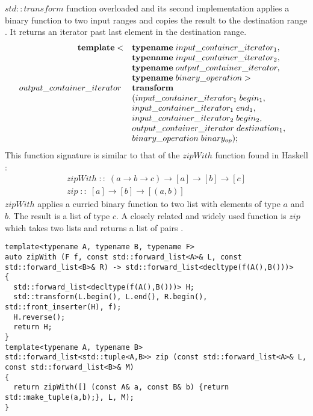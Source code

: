 \documentclass[12pt,fleqn]{article}
\begin{document}
$std::transform$ function overloaded and its second implementation applies a binary function to two input ranges and copies the result to the destination range \cite{jouttis, std::transform}. 
It returns an iterator past last element in the destination range.
\[
\begin{array}{rll}
\mbox{\bf template}<& \mbox{\bf typename}\; input\_container\_iterator_1, \\
                &\mbox{\bf typename}\; input\_container\_iterator_2, \\
               &\mbox{\bf typename} \; output \_container\_iterator, \\
             &\mbox{\bf typename} \; binary\_operation> &\\
output\_container\_iterator\;& \mbox{\bf transform}\\
&( input\_container\_iterator_1\; begin_1, \\
& input\_container\_iterator_1 \; end_1, \\
&input\_container\_iterator_2\; begin_2, \\
& output\_container\_iterator \; destination_1, \\
& binary\_operation \; binary_{op} );
\end{array}
\]
%
This function signature is similar to that of the $zipWith$ function found in Haskell \cite{lipovaca, hutton}:
\begin{eqnarray*}
zipWith \;::\; (a \rightarrow b \rightarrow c ) \rightarrow [a] \rightarrow [b] \rightarrow [c] \\
zip \;::\;  [a] \rightarrow [b] \rightarrow [(a,b)]
\end{eqnarray*}
$zipWith$ applies a curried binary function to two list with elements of type $a$ and $b$.
The result is a list of type $c$.
A closely related and widely used function is $zip$ which takes two lists and returns a list of pairs \cite{zip}.
%
\begin{lstlisting}[caption=zipWith and zip implemented with std::transform, label=zipWith]
template<typename A, typename B, typename F>
auto zipWith (F f, const std::forward_list<A>& L, const std::forward_list<B>& R) -> std::forward_list<decltype(f(A(),B()))>
{
  std::forward_list<decltype(f(A(),B()))> H;
  std::transform(L.begin(), L.end(), R.begin(), std::front_inserter(H), f);
  H.reverse();
  return H;
}
template<typename A, typename B>
std::forward_list<std::tuple<A,B>> zip (const std::forward_list<A>& L, const std::forward_list<B>& M) 
{
  return zipWith([] (const A& a, const B& b) {return std::make_tuple(a,b);}, L, M);
}

\end{lstlisting}
\end{document}

